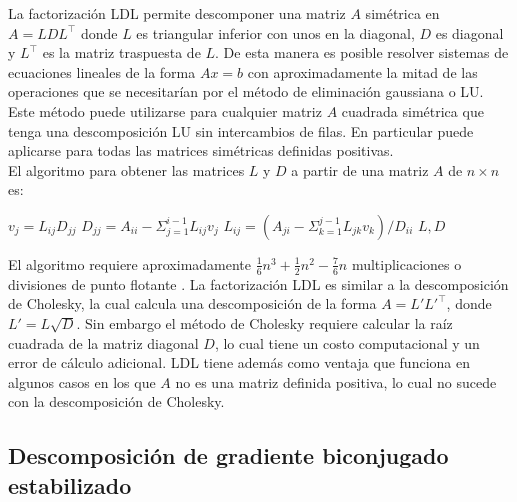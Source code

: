 
La factorización LDL permite descomponer una matriz $A$ simétrica en $A = L D L^\intercal$ donde $L$ es triangular inferior con unos en la diagonal, $D$ es diagonal y $L^\intercal$ es la matriz traspuesta de $L$. De esta manera es posible resolver sistemas de ecuaciones lineales de la forma $Ax = b$ con aproximadamente la mitad de las operaciones que se necesitarían por el método de eliminación gaussiana o LU. Este método puede utilizarse para cualquier matriz $A$ cuadrada simétrica que tenga una descomposición LU sin intercambios de filas. En particular puede aplicarse para todas las matrices simétricas definidas positivas.\\

El algoritmo para obtener las matrices $L$ y $D$ a partir de una matriz $A$ de $n \times n$ es:\\


\begin{algorithmic}
			\STATE $v_j = L_{ij} D_{jj}$
		\ENDFOR
		\STATE $D_{jj} = A_{ii} - \Sigma_{j=1}^{i-1} L_{ij} v_j$
			\STATE $L_{ij} = \left( A_{ji} - \Sigma_{k=1}^{j-1} L_{jk} v_k \right) / D_{ii}$
		\ENDFOR
	\ENDFOR
	\RETURN $L, D$
\end{algorithmic}


El algoritmo requiere aproximadamente $\frac{1}{6} n^3 + \frac{1}{2} n^2 - \frac{7}{6}n$
multiplicaciones o divisiones de punto flotante \cite{burden}. La factorización LDL es similar a la descomposición de Cholesky, la cual calcula una descomposición de la forma $A = L'L'^\intercal$, donde $L' = L\sqrt{D}$. Sin embargo el método de Cholesky requiere calcular la raíz cuadrada de la matriz diagonal $D$, lo cual tiene un costo computacional y un error de cálculo adicional. LDL tiene además como ventaja que funciona en algunos casos en los que $A$ no es una matriz definida positiva, lo cual no sucede con la descomposición de Cholesky.


\subsection*{Descomposición de gradiente biconjugado estabilizado}

